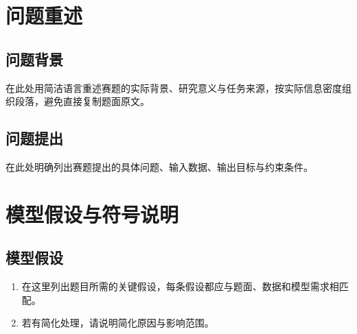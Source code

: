 \documentclass[bwprint]{gmcmthesis}
\begin{document}
\pagestyle{plain}

\maketoc
\clearpage


\section{问题重述}

\subsection{问题背景}
在此处用简洁语言重述赛题的实际背景、研究意义与任务来源，按实际信息密度组织段落，避免直接复制题面原文。

\subsection{问题提出}
在此处明确列出赛题提出的具体问题、输入数据、输出目标与约束条件。

\section{模型假设与符号说明}

\subsection{模型假设}
\begin{enumerate}
\item 在这里列出题目所需的关键假设，每条假设都应与题面、数据和模型需求相匹配。
\item 若有简化处理，请说明简化原因与影响范围。
\end{enumerate}
\end{document}
